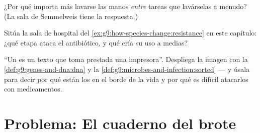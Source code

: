 \begin{exercise}[$\star\star$]\label{exo:g9:microbes-and-infection:10}
¿Por qué importa más lavarse las manos \emph{entre} tareas que
lavárselas a menudo? (La sala de Semmelweis tiene la respuesta.)
\end{exercise}

\begin{exercise}[$\star\star$]\label{exo:g9:microbes-and-infection:11}
Sitúa la sala de hospital del
\cref{ex:g9:how-species-change:resistance} en este capítulo: ¿qué etapa
ataca el antibiótico, y qué cría su uso a medias?
\end{exercise}

\begin{exercise}[$\star\star\star$]\label{exo:g9:microbes-and-infection:12}
``Un  es un texto que toma prestada una impresora''. Despliega la
imagen con la \cref{def:g9:genes-and-dna:dna} y la
\cref{def:g9:microbes-and-infection:sorted} --- y úsala para decir por
qué están los  en el borde de la vida y por qué es difícil
atacarlos con medicamentos.
\end{exercise}

\section{Problema: El cuaderno del brote}

